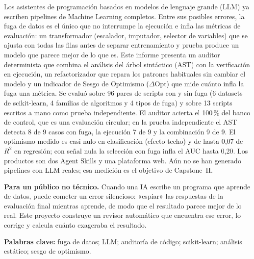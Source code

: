 \documentclass{udla-capstone}
\newcommand{\DOpt}{\ensuremath{\Delta\mathrm{Opt}}}
\begin{document}

\portada

\newpage

\begin{resumen}
Los asistentes de programación basados en modelos de lenguaje grande (LLM) ya escriben pipelines de Machine Learning completos. Entre sus posibles errores, la fuga de datos es el único que no interrumpe la ejecución e infla las métricas de evaluación: un transformador (escalador, imputador, selector de variables) que se ajusta con todas las filas antes de separar entrenamiento y prueba produce un modelo que parece mejor de lo que es. Este informe presenta un auditor determinista que combina el análisis del árbol sintáctico (AST) con la verificación en ejecución, un refactorizador que repara los patrones habituales sin cambiar el modelo y un indicador de Sesgo de Optimismo (\DOpt) que mide cuánto infla la fuga una métrica. Se evaluó sobre 96 pares de scripts con y sin fuga (6 datasets de scikit-learn, 4 familias de algoritmos y 4 tipos de fuga) y sobre 13 scripts escritos a mano como prueba independiente. El auditor acierta el 100\,\% del banco de control, que es una evaluación circular; en la prueba independiente el AST detecta 8 de 9 casos con fuga, la ejecución 7 de 9 y la combinación 9 de 9. El optimismo medido es casi nulo en clasificación (efecto techo) y de hasta 0,07 de $R^2$ en regresión; con señal nula la selección con fuga infla el AUC hasta 0,20. Los productos son dos Agent Skills y una plataforma web. Aún no se han generado pipelines con LLM reales; esa medición es el objetivo de Capstone~II.

\medskip
\noindent\textbf{Para un público no técnico.} Cuando una IA escribe un programa que aprende de datos, puede cometer un error silencioso: «espiar» las respuestas de la evaluación final mientras aprende, de modo que el resultado parece mejor de lo real. Este proyecto construye un revisor automático que encuentra ese error, lo corrige y calcula cuánto exageraba el resultado.
\end{resumen}

\begin{center}
    \textbf{Palabras clave:} fuga de datos; LLM; auditoría de código; scikit-learn; análisis estático; sesgo de optimismo.
\end{center}

\newpage
\end{document}
